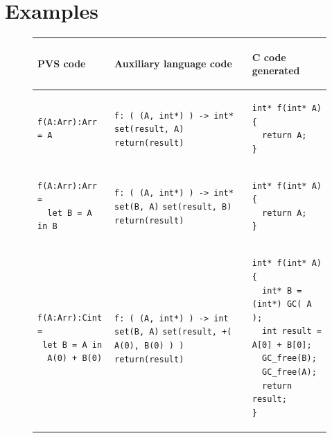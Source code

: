 \documentclass[12pt,a4paper,titlepage]{article}
\newcommand{\cl}[1]{\texttt{#1}}
\begin{document}
\newpage
\section{Examples}


\begin{figure}[h!]
\begin{tabular}{|p{5.2cm}|p{5.8cm}|p{6cm}|}
\hline
\begin{center}
PVS code
\end{center} &
\begin{center}
Auxiliary language code
\end{center} &
\begin{center}
C code generated
\end{center} \\ \hline

\begin{lstlisting}
f(A:Arr):Arr = A
\end{lstlisting} &
\cl{f: ( (A, int*) ) -> int*} \newline
\cl{set(result, A)} \newline
\cl{return(result)} &
\begin{lstlisting}
int* f(int* A) {
  return A;
}
\end{lstlisting} \\ \hline

\begin{lstlisting}
f(A:Arr):Arr =
  let B = A in B
\end{lstlisting} &
\cl{f: ( (A, int*) ) -> int*} \newline
\cl{set(B, A)} \newline
\cl{set(result, B)} \newline
\cl{return(result)} &
\begin{lstlisting}
int* f(int* A) {
  return A;
}
\end{lstlisting} \\ \hline

\begin{lstlisting}
f(A:Arr):Cint =
 let B = A in
  A(0) + B(0)
\end{lstlisting} &
\cl{f: ( (A, int*) ) -> int} \newline
\cl{set(B, A)} \newline
\cl{set(result, +( A(0), B(0) ) )} \newline
\cl{return(result)} &
\begin{lstlisting}
int* f(int* A) {
  int* B = (int*) GC( A );
  int result = A[0] + B[0];
  GC_free(B);
  GC_free(A);
  return result;
}
\end{lstlisting} \\ \hline


\end{tabular}
\end{figure}
\end{document}
